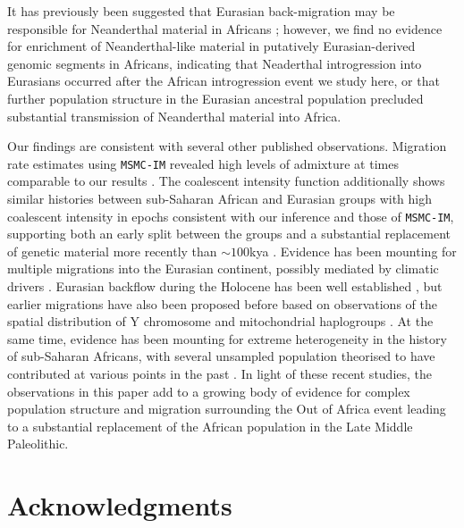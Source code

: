 It has previously been suggested that Eurasian back-migration may be responsible for Neanderthal material in Africans \cite{Chen2020}; however, we find no evidence for enrichment of Neanderthal-like material in putatively Eurasian-derived genomic segments in Africans, indicating that Neaderthal introgression into Eurasians occurred after the African introgression event we study here, or that further population structure in the Eurasian ancestral population precluded substantial transmission of Neanderthal material into Africa.

Our findings are consistent with several other published observations. Migration rate estimates using {\tt MSMC-IM} revealed high levels of admixture at times comparable to our results \cite{Wang2019a}. The coalescent intensity function additionally shows similar histories between sub-Saharan African and Eurasian groups with high coalescent intensity in epochs consistent with our inference and those of {\tt MSMC-IM}, supporting both an early split between the groups and a substantial replacement of genetic material more recently than $\sim100$kya \cite{Albers2019}. Evidence has been mounting for multiple migrations into the Eurasian continent, possibly mediated by climatic drivers \cite{Timmermann2016, Pagani2016}. Eurasian backflow during the Holocene has been well established \cite{Lopez2015, GallegoLlorente2015}, but earlier migrations have also been proposed before based on observations of the spatial distribution of Y chromosome and mitochondrial haplogroups \cite{Altheide1997, Hammer1998, Cruciani2002, Chandrasekar2007, Cabrera2018, Hervella2016, Haber2019}. At the same time, evidence has been mounting for extreme heterogeneity in the history of sub-Saharan Africans, with several unsampled population theorised to have contributed at various points in the past \cite{Lipson2019, Durvasula2019, Speidel2019}. In light of these recent studies, the observations in this paper add to a growing body of evidence for complex population structure and migration surrounding the Out of Africa event leading to a substantial replacement of the African population in the Late Middle Paleolithic.  

\section{Acknowledgments}

